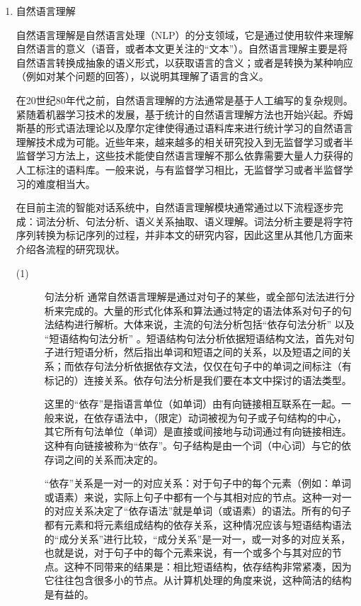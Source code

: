 \begin{enumerate}

\item{自然语言理解}

自然语言理解是自然语言处理（NLP）的分支领域，它是通过使用软件来理解自然语言的意义（语音，或者本文更关注的“文本”）。自然语言理解主要是将自然语言转换成抽象的语义形式，以获取语言的含义；或者是转换为某种响应（例如对某个问题的回答），以说明其理解了语言的含义。

在20世纪80年代之前，自然语言理解的方法通常是基于人工编写的复杂规则。紧随着机器学习技术的发展，基于统计的自然语言理解方法也开始兴起\cite{Tan1992}。乔姆斯基的形式语法理论以及摩尔定律使得通过语料库来进行统计学习的自然语言理解技术成为可能\cite{Gupta2014}。近些年来，越来越多的相关研究投入到无监督学习或者半监督学习方法上，这些技术能使自然语言理解不那么依靠需要大量人力获得的人工标注的语料库。一般来说，与有监督学习相比，无监督学习或者半监督学习的难度相当大\cite{Gupta2014}。

在目前主流的智能对话系统中，自然语言理解模块通常通过以下流程逐步完成：词法分析、句法分析、语义关系抽取、语义理解。词法分析主要是将字符序列转换为标记序列的过程，并非本文的研究内容，因此这里从其他几方面来介绍各流程的研究现状。


\begin{description}
\item[(1)]{句法分析}
通常自然语言理解是通过对句子的某些，或全部句法法进行分析来完成的。大量的形式化体系和算法通过特定的语法体系对句子的句法结构进行解析。大体来说，主流的句法分析包括“依存句法分析” \cite{Eisner1996a, Eisner1996b, Yamada2003} 以及 “短语结构句法分析” \cite{Chomsky1957, Pollard1994}。短语结构句法分析依据短语结构文法\cite{Thompson1981, Charniak1997, Makino1998, Charniak2006}，首先对句子进行短语分析，然后指出单词和短语之间的关系，以及短语之间的关系；而依存句法分析依据依存文法\cite{Tesniere1959, Melchunk1988}，仅仅在句子中的单词之间标注（有标记的）连接关系。依存句法分析是我们要在本文中探讨的语法类型。


这里的“依存”是指语言单位（如单词）由有向链接相互联系在一起。一般来说，在依存语法中，（限定）动词被视为句子或子句结构的中心，其它所有句法单位（单词）是直接或间接地与动词通过有向链接相连。这种有向链接被称为“依存”。句子结构是由一个词（中心词）与它的依存词之间的关系而决定的。


“依存”关系是一对一的对应关系：对于句子中的每个元素（例如：单词或语素）来说，实际上句子中都有一个与其相对应的节点。这种一对一的对应关系决定了“依存语法”就是单词（或语素）的语法。所有的句子都有元素和将元素组成结构的依存关系，这种情况应该与短语结构语法的“成分关系”进行比较，“成分关系”是一对一，或一对多的对应关系，也就是说，对于句子中的每个元素来说，有一个或多个与其对应的节点。这种不同带来的结果是：相比短语结构，依存结构非常紧凑，因为它往往包含很多小的节点。从计算机处理的角度来说，这种简洁的结构是有益的。



\end{description}
\end{enumerate}
